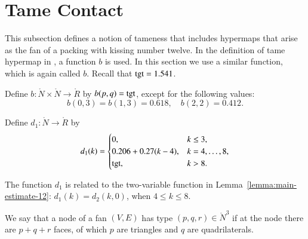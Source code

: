 \documentclass{llncs}
\def\op#1{{\hbox{#1}}}
\begin{document}
\section{Tame Contact}

This subsection defines a notion of tameness that includes hypermaps
that arise as the fan of a packing with kissing number twelve.  In the
definition of tame hypermap in \cite{DSP}, a function $b$
is used.  In this section we use a similar function,  which is
again called $b$.   Recall that $\op{tgt}=1.541$.  %
%

\begin{definition}[b]
  Define $b:\ring{N}\times \ring{N}\to \ring{R}$ by
  $b\pqr{(p,q)}=\op{tgt}$, except for the following values:
\[
b(0,3)=b(1,3)=0.618,\quad b(2,2)=0.412.
\]
\end{definition}
%

\begin{definition}[d]
Define $d_1:\ring{N}\to \ring{R}$ by
\[d_1(k) = \begin{cases}
0, & k\le 3, \\
0.206 + 0.27 (k-4),& k=4,\ldots,8,\\
\op{tgt},& k>8.\\
\end{cases}
\]
\end{definition}
%

The function $d_1$ is related to the two-variable function in
Lemma~\ref{lemma:main-estimate-12}: $d_1(k) = d_2(k,0)$, when $4\le k\le
8$.

We say that a node of a  fan $(V,E)$ has type $(p,q,r)\in\ring{N}^3$ if at the node there are
$p+q+r$ faces, of which $p$ are triangles and $q$ are quadrilaterals.
\end{document}
